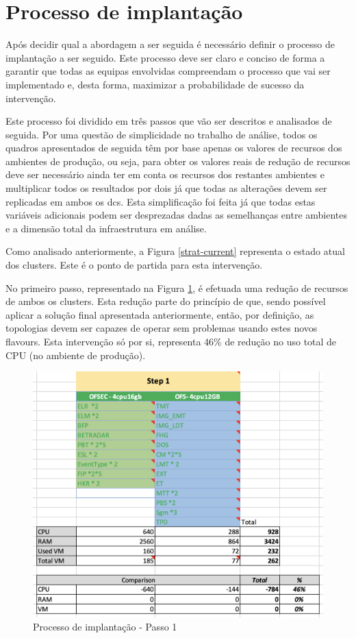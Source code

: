 \section{Processo de implantação}

Após decidir qual a abordagem a ser seguida é necessário definir o processo de implantação a ser
seguido. Este processo deve ser claro e conciso de forma a garantir que todas as equipas envolvidas
compreendam o processo que vai ser implementado e, desta forma, maximizar a probabilidade de
sucesso da intervenção. 

Este processo foi dividido em três passos que vão ser descritos e analisados de seguida. Por uma
questão de simplicidade no trabalho de análise, todos os quadros apresentados de seguida têm por 
base apenas os valores de recursos dos ambientes de produção, ou seja, para obter os valores reais
de redução de recursos deve ser necessário ainda ter em conta os recursos dos restantes ambientes
e multiplicar todos os resultados por dois já que todas as alterações devem ser replicadas em 
ambos os \glspl{dc}. Esta simplificação foi feita já que todas estas variáveis adicionais podem 
ser desprezadas dadas as semelhanças entre ambientes e a dimensão total da infraestrutura em
análise.

Como analisado anteriormente, a Figura \ref{strat-current} representa o estado atual dos 
\glspl{cluster}. Este é o ponto de partida para esta intervenção. 

No primeiro passo, representado na Figura \ref{strat-1}, é efetuada uma redução de recursos 
de ambos os \glspl{cluster}. Esta redução parte do princípio de que, sendo possível aplicar a 
solução final apresentada anteriormente, então, por definição, as topologias devem ser capazes de
operar sem problemas usando estes novos \glspl{flavour}. Esta intervenção só por si, representa
46\% de redução no uso total de \ac{CPU} (no ambiente de produção).

\begin{figure}[H]
  \centerline{\includegraphics[scale=0.5]{media/content/analise/strat-1.png}}
  \caption{Processo de implantação - Passo 1}
  \label{strat-1}
\end{figure}

